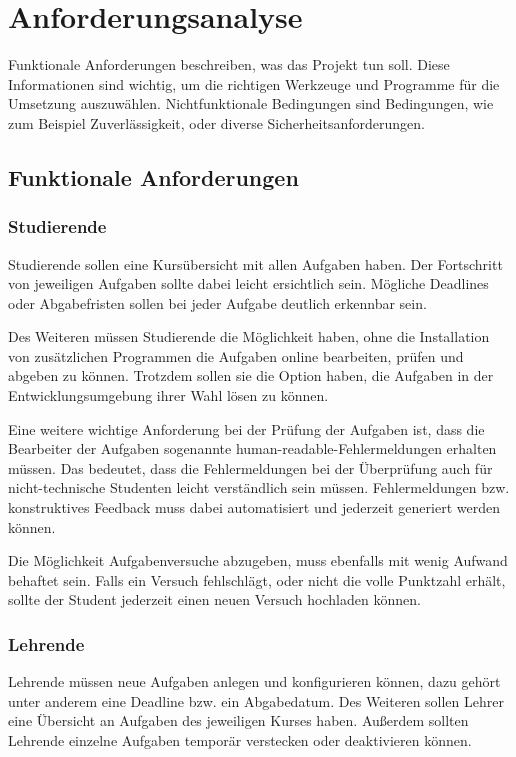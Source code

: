 \section{Anforderungsanalyse}
Funktionale Anforderungen beschreiben, was das Projekt tun soll. Diese
Informationen sind wichtig, um die richtigen Werkzeuge und Programme für die
Umsetzung auszuwählen. Nichtfunktionale Bedingungen sind Bedingungen, wie zum
Beispiel Zuverlässigkeit, oder diverse Sicherheitsanforderungen.
\subsection{Funktionale Anforderungen}
\subsubsection{Studierende}
Studierende sollen eine Kursübersicht mit allen Aufgaben haben. Der Fortschritt
von jeweiligen Aufgaben sollte dabei leicht ersichtlich sein. Mögliche Deadlines
oder Abgabefristen sollen bei jeder Aufgabe deutlich erkennbar sein.

Des Weiteren müssen Studierende die Möglichkeit haben, ohne die Installation von zusätzlichen Programmen die Aufgaben online bearbeiten, prüfen und abgeben
zu können. Trotzdem sollen sie die Option haben, die Aufgaben in der Entwicklungsumgebung ihrer Wahl lösen zu können.

Eine weitere wichtige Anforderung bei der Prüfung der Aufgaben ist, dass
die Bearbeiter der Aufgaben sogenannte
\glqq human-readable\grqq{}-Fehlermeldungen erhalten müssen. Das bedeutet, dass
die Fehlermeldungen bei der Überprüfung auch für nicht-technische Studenten
leicht verständlich sein müssen. Fehlermeldungen bzw. konstruktives Feedback
muss dabei automatisiert und jederzeit generiert werden können.

Die Möglichkeit Aufgabenversuche abzugeben, muss ebenfalls mit wenig Aufwand
behaftet sein. Falls ein Versuch fehlschlägt, oder nicht die volle Punktzahl
erhält, sollte der Student jederzeit einen neuen Versuch hochladen können.

\subsubsection{Lehrende}
Lehrende müssen neue Aufgaben anlegen und konfigurieren können, dazu gehört
unter anderem eine Deadline bzw. ein Abgabedatum. Des Weiteren sollen Lehrer
eine Übersicht an Aufgaben des jeweiligen Kurses haben. Außerdem sollten
Lehrende einzelne Aufgaben temporär verstecken oder deaktivieren können.

